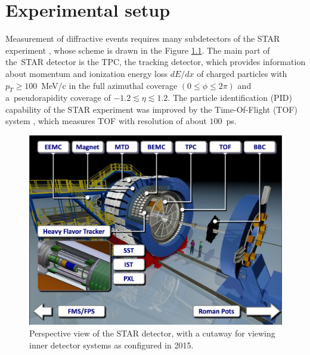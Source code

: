 

\chapter{Experimental setup}\label{chap:experimentalsetup}
Measurement of diffractive events requires many subdetectors of the STAR experiment \cite{Ackermann:2002ad}, whose scheme is drawn in the Figure \ref{fig:starscheme}.
The main part of the~STAR detector is the TPC, the tracking detector, which provides information about momentum  and ionization energy loss $dE/dx$ of charged particles with $p_T \geq 100$~MeV/c in the full azimuthal coverage $\left(0\leq \phi \leq 2\pi\right)$ and a~pseudorapidity coverage of $-1.2 \lesssim \eta \lesssim 1.2$. The particle identification (PID) capability of the STAR experiment was improved by the Time-Of-Flight (TOF) system \cite{Llope:2009zz},  which measures TOF with resolution of about $100$~ps. 
\begin{figure}[hb]
	\centering
	
	\includegraphics[width=0.9\linewidth]{graphics/experimentalSetup/star.png}
	
	\caption[Perspective view of the STAR detector, with a cutaway for viewing inner detector systems as configured in 2015.]{ Perspective view of the STAR detector, with a cutaway for viewing inner detector systems as configured in 2015.}
	\label{fig:starscheme}
\end{figure}

